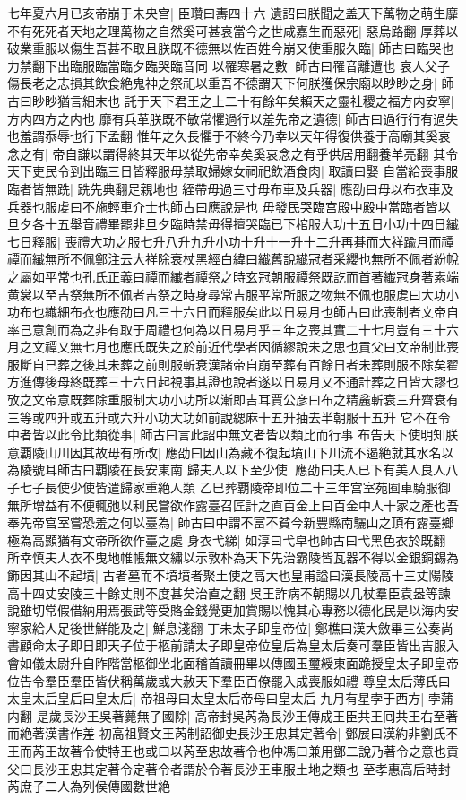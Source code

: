 七年夏六月已亥帝崩于未央宫|{
	臣瓚曰夀四十六}
遺詔曰朕聞之盖天下萬物之萌生靡不有死死者天地之理萬物之自然奚可甚哀當今之世咸嘉生而惡死|{
	惡烏路翻}
厚葬以破業重服以傷生吾甚不取且朕既不德無以佐百姓今崩又使重服久臨|{
	師古曰臨哭也力禁翻下出臨服臨當臨夕臨哭臨音同}
以罹寒暑之數|{
	師古曰罹音離遭也}
哀人父子傷長老之志損其飲食絶鬼神之祭祀以重吾不德謂天下何朕獲保宗廟以眇眇之身|{
	師古曰眇眇猶言細末也}
託于天下君王之上二十有餘年矣賴天之靈社稷之福方内安寧|{
	方内四方之内也}
靡有兵革朕既不敏常懼過行以羞先帝之遺德|{
	師古曰過行行有過失也羞謂忝辱也行下孟翻}
惟年之久長懼于不終今乃幸以天年得復供養于高廟其奚哀念之有|{
	帝自謙以謂得終其天年以從先帝幸矣奚哀念之有乎供居用翻養羊亮翻}
其令天下吏民令到出臨三日皆釋服毋禁取婦嫁女祠祀飲酒食肉|{
	取讀曰娶}
自當給喪事服臨者皆無跣|{
	跣先典翻足親地也}
絰帶毋過三寸毋布車及兵器|{
	應劭曰毋以布衣車及兵器也服䖍曰不施輕車介士也師古曰應說是也}
毋發民哭臨宫殿中殿中當臨者皆以旦夕各十五舉音禮畢罷非旦夕臨時禁毋得擅哭臨已下棺服大功十五日小功十四日纎七日釋服|{
	喪禮大功之服七升八升九升小功十升十一升十二升再朞而大祥踰月而禫禫而纎無所不佩鄭注云大祥除衰杖黑經白緯曰纎舊說纎冠者采纓也無所不佩者紛帨之屬如平常也孔氏正義曰禫而纎者禫祭之時玄冠朝服禫祭既訖而首著纎冠身著素端黄裳以至吉祭無所不佩者吉祭之時身尋常吉服平常所服之物無不佩也服䖍曰大功小功布也纎細布衣也應劭曰凡三十六日而釋服矣此以日易月也師古曰此喪制者文帝自率己意創而為之非有取于周禮也何為以日易月乎三年之喪其實二十七月豈有三十六月之文禫又無七月也應氏既失之於前近代學者因循繆說未之思也貢父曰文帝制此喪服斷自已葬之後其未葬之前則服斬衰漢諸帝自崩至葬有百餘日者未葬則服不除矣翟方進傳後母終既葬三十六日起視事其證也說者遂以日易月又不通計葬之日皆大謬也攷之文帝意既葬除重服制大功小功所以漸即吉耳賈公彦曰布之精麄斬衰三升齊衰有三等或四升或五升或六升小功大功如前說緦麻十五升抽去半朝服十五升}
它不在令中者皆以此令比類從事|{
	師古曰言此詔中無文者皆以類比而行事}
布告天下使明知朕意覇陵山川因其故毋有所改|{
	應劭曰因山為藏不復起墳山下川流不遏絶就其水名以為陵號耳師古曰覇陵在長安東南}
歸夫人以下至少使|{
	應劭曰夫人已下有美人良人八子七子長使少使皆遣歸家重絶人類}
乙巳葬覇陵帝即位二十三年宫室苑囿車騎服御無所增益有不便輒弛以利民嘗欲作露臺召匠計之直百金上曰百金中人十家之產也吾奉先帝宫室嘗恐羞之何以臺為|{
	師古曰中謂不富不貧今新豐縣南驪山之頂有露臺鄉極為高顯猶有文帝所欲作臺之處}
身衣弋綈|{
	如淳曰弋皁也師古曰弋黑色衣於既翻}
所幸慎夫人衣不曳地帷帳無文繡以示敦朴為天下先治霸陵皆瓦器不得以金銀銅錫為飾因其山不起墳|{
	古者墓而不墳墳者聚土使之高大也皇甫謚曰漢長陵高十三丈陽陵高十四丈安陵三十餘丈則不度甚矣治直之翻}
吳王詐病不朝賜以几杖羣臣袁盎等諫說雖切常假借納用焉張武等受賂金錢覺更加賞賜以愧其心專務以德化民是以海内安寧家給人足後世鮮能及之|{
	鮮息淺翻}
丁未太子即皇帝位|{
	鄭樵曰漢大斂畢三公奏尚書顧命太子即日即天子位于柩前請太子即皇帝位皇后為皇太后奏可羣臣皆出吉服入會如儀太尉升自阼階當柩御坐北面稽首讀冊畢以傳國玉璽綬東面跪授皇太子即皇帝位告令羣臣羣臣皆伏稱萬歲或大赦天下羣臣百僚罷入成喪服如禮}
尊皇太后薄氏曰太皇太后皇后曰皇太后|{
	帝祖母曰太皇太后帝母曰皇太后}
九月有星孛于西方|{
	孛蒲内翻}
是歲長沙王吳著薨無子國除|{
	高帝封吳芮為長沙王傳成王臣共王囘共王右至著而絶著漢書作差}
初高祖賢文王芮制詔御史長沙王忠其定著令|{
	鄧展曰漢約非劉氏不王而芮王故著令使特王也或曰以芮至忠故著令也仲馮曰兼用鄧二說乃著令之意也貢父曰長沙王忠其定著令定著令者謂於令著長沙王車服土地之類也}
至孝惠高后時封芮庶子二人為列侯傳國數世絶


